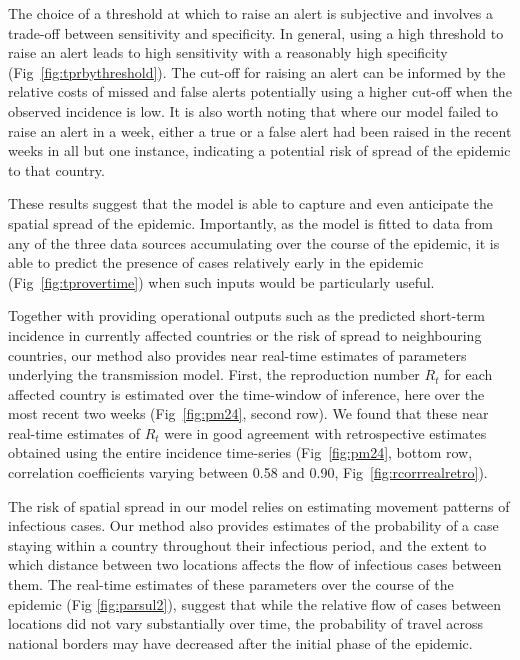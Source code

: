 \documentclass[9pt,twocolumn,twoside,lineno]{pnas-new}
\begin{document}
The choice of a threshold at which to raise an alert is subjective and
involves a trade-off between sensitivity and specificity. 
In general, using a high threshold to raise an alert leads to 
high sensitivity with a reasonably high specificity
(Fig~\ref{fig:tprbythreshold}). 
The cut-off for raising an alert can be informed by 
the relative costs of missed and false alerts potentially
using a higher cut-off when the observed incidence is low. 
It is also worth noting that where our model failed to raise an
alert in a week, either a true or a false alert had
been raised in the recent weeks in all but one instance,
indicating a potential risk of spread of the epidemic to that country.

These results suggest that the model is able to
capture and even anticipate the spatial spread of the epidemic. 
Importantly, as the model is fitted to data from any of the
three data sources accumulating over
the course of the epidemic, it is able to predict the presence of
cases relatively early in the epidemic (Fig~\ref{fig:tprovertime}) 
when such inputs would be particularly useful.

Together with providing operational outputs such as the predicted
short-term incidence in currently affected countries or the risk of
spread to neighbouring countries, our method also provides near
real-time estimates of parameters underlying the transmission model.
First, the reproduction number \(R_t\) for each affected country is
estimated over the time-window of inference, here over the most recent
two weeks (Fig~\ref{fig:pm24}, second row). We found that these near real-time
estimates of \(R_t\) were in good agreement with retrospective estimates
obtained using the entire incidence time-series (Fig~\ref{fig:pm24}, bottom row,
correlation coefficients varying between 0.58 and 0.90, 
Fig~\ref{fig:rcorrrealretro}).

The risk of spatial spread in our model relies on estimating movement
patterns of infectious cases. Our method also provides estimates of
the probability of a case staying within a country throughout their
infectious period, and  the extent to which
distance between two locations affects the flow of
infectious cases between them. The
real-time estimates of these parameters over the course of the
epidemic (Fig \ref{fig:parsul2}), suggest that while the relative flow
of cases between locations did not vary substantially over time, the probability
of travel across national borders may have decreased after the initial
phase of the epidemic.
\end{document}
